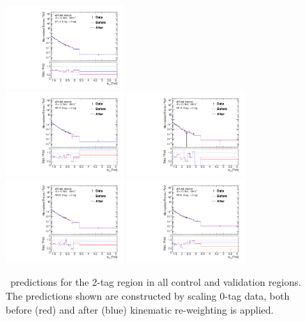 \begin{figure}[htbp!]
\begin{center}
\includegraphics[width=0.40\textwidth]{BDT/VHqqbbBDTReweightShape_mVH_CR_0tag_to_2tag.pdf} \\
\includegraphics[width=0.40\textwidth]{BDT/VHqqbbBDTReweightShape_mVH_VR1B_0tag_to_2tag.pdf}
\includegraphics[width=0.40\textwidth]{BDT/VHqqbbBDTReweightShape_mVH_VR1A_0tag_to_2tag.pdf} \\
\includegraphics[width=0.40\textwidth]{BDT/VHqqbbBDTReweightShape_mVH_VR2B_0tag_to_2tag.pdf}
\includegraphics[width=0.40\textwidth]{BDT/VHqqbbBDTReweightShape_mVH_VR2A_0tag_to_2tag.pdf}
\end{center}
\caption{\mvh\ predictions for the 2-tag region in all control and validation regions. The predictions shown are constructed by scaling 0-tag data, both before (red) and after (blue) kinematic re-weighting is applied.}
\label{fig:bdt_shape_mVH_2tag}
\end{figure}

